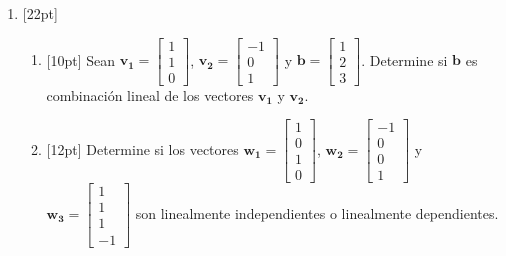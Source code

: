 \documentclass[11pt]{article}
\begin{document}
\begin{enumerate}
\item{}[22pt]
\begin{enumerate}
\item{}[10pt] Sean $\mathbf{v_1} = \begin{bmatrix}1\\1\\0\end{bmatrix}$, $\mathbf{v_2} = \begin{bmatrix}-1\\0\\1\end{bmatrix}$ y $\mathbf{b} = \begin{bmatrix}1\\2\\3\end{bmatrix}$. Determine si $\mathbf{b}$ es combinación lineal de los vectores $\mathbf{v_1}$ y $\mathbf{v_2}$.

\vspace{6cm}

\item{}[12pt] Determine si los vectores $\mathbf{w_1} = \begin{bmatrix}1\\0\\1\\0\end{bmatrix}$, $\mathbf{w_2} = \begin{bmatrix}-1\\0\\0\\1\end{bmatrix}$ y $\mathbf{w_3} = \begin{bmatrix}1\\1\\1\\-1\end{bmatrix}$ son linealmente independientes o linealmente dependientes.

\vspace{6cm}
\end{enumerate}
\end{enumerate}

\examfooter
\end{document}
